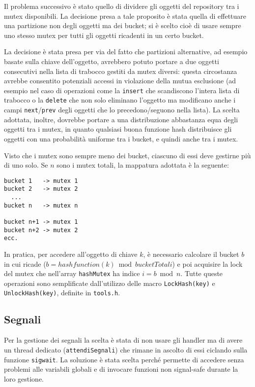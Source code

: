 \documentclass[a4paper,12pt]{article}
\begin{document}
Il problema successivo è stato quello di dividere gli oggetti del repository tra i mutex disponibili. La decisione presa a tale proposito è stata quella di effettuare una partizione non degli oggetti ma dei bucket; si è scelto cioè di usare sempre uno stesso mutex per tutti gli oggetti ricadenti in un certo bucket.

La decisione è stata presa per via del fatto che partizioni alternative, ad esempio basate sulla chiave dell'oggetto, avrebbero potuto portare a due oggetti consecutivi nella lista di trabocco gestiti da mutex diversi: questa circostanza avrebbe consentito potenziali accessi in violazione della mutua esclusione (ad esempio nel caso di operazioni come la \texttt{insert} che scandiscono l'intera lista di trabocco o la \texttt{delete} che non solo eliminano l'oggetto ma modificano anche i campi \texttt{next}/\texttt{prev} degli oggetti che lo precedono/seguono nella lista). La scelta adottata, inoltre, dovrebbe portare a una distribuzione abbastanza equa degli oggetti tra i mutex, in quanto qualsiasi buona funzione hash distribuisce gli oggetti con una probabilità uniforme tra i bucket, e quindi anche tra i mutex.

Visto che i mutex sono sempre meno dei bucket, ciascuno di essi deve gestirne più di uno solo. Se $n$ sono i mutex totali, la mappatura adottata è la seguente:

\begin{verbatim}
bucket 1   -> mutex 1
bucket 2   -> mutex 2
  ...
bucket n   -> mutex n

bucket n+1 -> mutex 1
bucket n+2 -> mutex 2
ecc.
\end{verbatim}

In pratica, per accedere all'oggetto di chiave $k$, è necessario calcolare il bucket $b$ in cui ricade ($b = hashfunction(k) \bmod bucketTotali$) e poi acquisire la lock del mutex che nell'array \texttt{hashMutex} ha indice $i = b \bmod n$. Tutte queste operazioni sono semplificate dall'utilizzo delle macro \texttt{LockHash(key)} e \texttt{UnlockHash(key)}, definite in \texttt{tools.h}.

\subsection{ Segnali }

Per la gestione dei segnali la scelta è stata di non usare gli handler ma di avere un thread dedicato (\texttt{attendiSegnali}) che rimane in ascolto di essi ciclando sulla funzione \texttt{sigwait}. La soluzione è stata scelta perché permette di accedere senza problemi alle variabili globali e di invocare funzioni non signal-safe durante la loro gestione.
\end{document}
